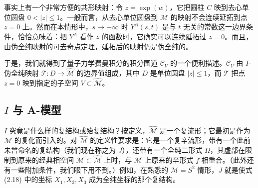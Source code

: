 \documentclass[11pt,a4paper,UTF8]{ctexart}
\theoremstyle{plain}
\theoremstyle{definition}
\begin{document}

事实上有一个非常方便的共形映射：令 $z=\exp(w)$，它把圆柱 $C$ 映到去心单位圆盘 $0<|z|\le1$。一般而言，从去心单位圆盘到 $\widehat{\mathcal M}$ 的映射不会连续延拓到点 $z=0$ 上。然而在本情形中，$s\to-\infty$ 时 $Y^A(s,t)$ 是与 $t$ 无关的常数这一边界条件，恰恰意味着：把 $Y^A$ 看作 $z$ 的函数时，它确实可以连续延拓过 $z=0$。而且，由伪全纯映射的可去奇点定理，延拓后的映射仍是伪全纯的。


于是，我们就得到了量子力学费曼积分的积分围道 $\mathcal C_V$ 的一个便利描述。$\mathcal C_V$ 由 $I$-伪全纯映射 $\mathcal T:D\to\widehat{\mathcal M}$ 的边界值组成，其中 $D$ 是单位圆盘 $|z|\le1$，而 $\mathcal T$ 把点 $z=0$ 映到指定的子空间 $V\subset\widehat{\mathcal M}$。





\subsection{\texorpdfstring{$I$}{I} 与 A-模型}

$I$ 究竟是什么样的复结构或殆复结构？按定义，$\widehat{\mathcal{M}}$ 是一个复流形；它最初是作为 $\mathcal{M}$ 的复化而引入的。对 $\widehat{\mathcal{M}}$ 的定义性要求是：它是一个复辛流形，带有一个此前未曾命名的复结构（我们现在称之为 $J$），还带有一个全纯二形式 $\Omega$，其虚部在限制到原来的经典相空间 $\mathcal{M}\subset\widehat{\mathcal{M}}$ 上时，与 $\mathcal{M}$ 上原来的辛形式 $f$ 相重合。（此外还有一些附加条件，我们眼下用不到。）例如，在熟悉的 $\mathcal{M}=S^2$ 情形，$J$ 就是使式 (2.18) 中的坐标 $X_1,X_2,X_3$ 成为全纯坐标的那个复结构。
\end{document}

